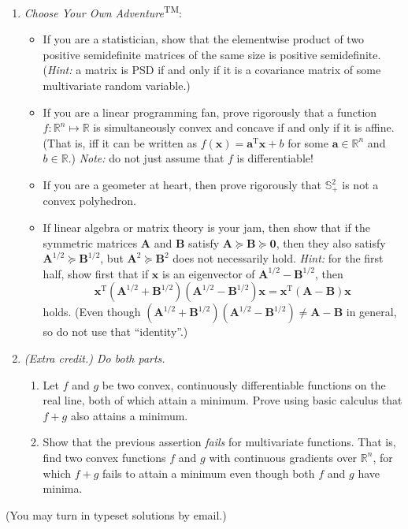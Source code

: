 \documentclass[onesided,10pt]{article}
\newcommand{\T}{\mathrm{T}}
\newcommand{\real}{\mathbb{R}}
\newcommand{\bS}{\mathbb{S}}
\newcommand{\va}{\mathbf{a}}
\newcommand{\vA}{\mathbf{A}}
\newcommand{\vB}{\mathbf{B}}
\newcommand{\vx}{\mathbf{x}}
\newcommand{\vzero}{\mathbf{0}}
\begin{document}
\begin{enumerate}[\bfseries 1.]
\item \emph{Choose Your Own Adventure}\textsuperscript{\tiny TM}:
\begin{itemize}
	\item If you are a statistician, show that the elementwise product of two positive semidefinite matrices of the same size is positive semidefinite. (\emph{Hint:} a matrix is PSD if and only if it is a covariance matrix of some multivariate random variable.)
	\item If you are a linear programming fan, prove rigorously that a function $f\colon \real^n\mapsto\real$ is simultaneously convex and concave if and only if it is affine. (That is, iff it can be written as $f(\vx)=\va^\T\vx+b$ for some $\va\in\real^n$ and $b\in\real$.)
	\emph{Note:} do not just assume that $f$ is differentiable!
	\item If you are a geometer at heart, then prove rigorously that $\bS^2_+$ is not a convex polyhedron.
	\item If linear algebra or matrix theory is your jam, then show that if the symmetric matrices $\vA$ and $\vB$ satisfy $\vA\succcurlyeq\vB\succcurlyeq\vzero$, then they also satisfy $\vA^{1/2}\succcurlyeq\vB^{1/2}$, but $\vA^2\succcurlyeq\vB^2$ does not necessarily hold. \emph{Hint:} for the first half, show first that if $\vx$ is an eigenvector of $\vA^{1/2}-\vB^{1/2}$, then
	\[ \vx^\T(\vA^{1/2}+\vB^{1/2})(\vA^{1/2}-\vB^{1/2})\vx = \vx^\T(\vA-\vB)\vx\]
	holds. (Even though $(\vA^{1/2}+\vB^{1/2})(\vA^{1/2}-\vB^{1/2})\neq\vA-\vB$ in general, so do not use that ``identity''.)
\end{itemize}



\item \textit{(Extra credit.) Do both parts.}
\begin{enumerate}
	\item Let $f$ and $g$ be two convex, continuously differentiable functions on the real line, both of which attain a minimum. Prove using basic calculus that $f+g$ also attains a minimum.

	\item Show that the previous assertion \emph{fails} for multivariate functions. That is, find two convex functions $f$ and $g$ with continuous gradients over $\real^n$, for which $f+g$ fails to attain a minimum even though both $f$ and $g$ have minima.
\end{enumerate}


\end{enumerate}

\bigskip

 (You may turn in typeset solutions by email.)
\end{document}
